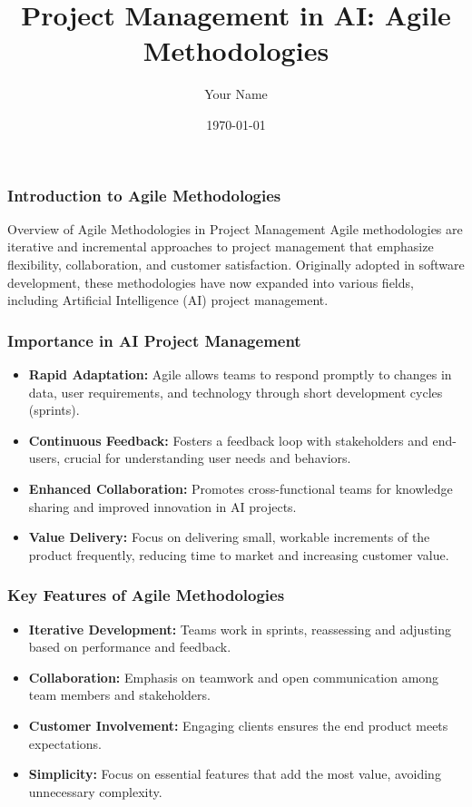 \documentclass{beamer}
\title{Project Management in AI: Agile Methodologies}
\author{Your Name}
\institute{Your Institution}
\date{\today}
\begin{document}
\frame{\titlepage}

\begin{frame}[fragile]
    \frametitle{Introduction to Agile Methodologies}
    \begin{block}{Overview of Agile Methodologies in Project Management}
        Agile methodologies are iterative and incremental approaches to project management that emphasize flexibility, collaboration, and customer satisfaction. Originally adopted in software development, these methodologies have now expanded into various fields, including Artificial Intelligence (AI) project management.
    \end{block}
\end{frame}

\begin{frame}[fragile]
    \frametitle{Importance in AI Project Management}
    \begin{itemize}
        \item \textbf{Rapid Adaptation:} Agile allows teams to respond promptly to changes in data, user requirements, and technology through short development cycles (sprints).
        \item \textbf{Continuous Feedback:} Fosters a feedback loop with stakeholders and end-users, crucial for understanding user needs and behaviors.
        \item \textbf{Enhanced Collaboration:} Promotes cross-functional teams for knowledge sharing and improved innovation in AI projects.
        \item \textbf{Value Delivery:} Focus on delivering small, workable increments of the product frequently, reducing time to market and increasing customer value.
    \end{itemize}
\end{frame}

\begin{frame}[fragile]
    \frametitle{Key Features of Agile Methodologies}
    \begin{itemize}
        \item \textbf{Iterative Development:} Teams work in sprints, reassessing and adjusting based on performance and feedback.
        \item \textbf{Collaboration:} Emphasis on teamwork and open communication among team members and stakeholders.
        \item \textbf{Customer Involvement:} Engaging clients ensures the end product meets expectations.
        \item \textbf{Simplicity:} Focus on essential features that add the most value, avoiding unnecessary complexity.
    \end{itemize}
\end{frame}
\end{document}
